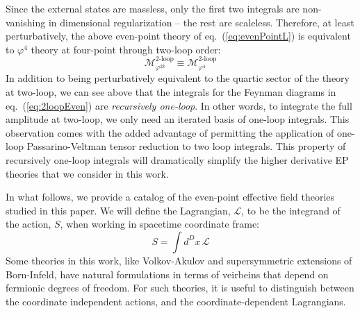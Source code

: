\documentclass[12pt,letter]{article}
\def\eqn#1{eq.~(\ref{#1})}
\def\be{\begin{equation}}
\def\ee{\end{equation}}
\begin{document}
Since the external states are massless, only the first two integrals are non-vanishing in dimensional regularization -- the rest are scaleless. Therefore, at least perturbatively, the above even-point theory of \eqn{eq:evenPointL} is equivalent to $\varphi^4$ theory at four-point through two-loop order: 
\begin{equation}
\mathcal{M}_{\varphi^{2k}}^{\text{2-loop}} \equiv \mathcal{M}_{\varphi^{4}}^{\text{2-loop}} 
\end{equation}
In addition to being perturbatively equivalent to the quartic sector of the theory at two-loop, we can see above that the integrals for the Feynman diagrams in \eqn{eq:2loopEven} are \textit{recursively one-loop}. In other words, to integrate the full amplitude at two-loop, we only need an iterated basis of one-loop integrals. This observation comes with the added advantage of permitting the application of one-loop Passarino-Veltman tensor reduction \cite{Passarino:1978jh} to two loop integrals. This property of recursively one-loop integrals will dramatically simplify the higher derivative EP theories that we consider in this work. 

In what follows, we provide a catalog of the even-point effective field theories studied in this paper. We will define the Lagrangian, $\mathcal{L}$, to be the integrand of the action, $S$, when working in spacetime coordinate frame:
\be
S= \int d^D x \,\mathcal{L}
\ee
Some theories in this work, like Volkov-Akulov and supersymmetric extensions of Born-Infeld, have natural formulations in terms of veirbeins that depend on fermionic degrees of freedom. For such theories, it is useful to distinguish between the coordinate independent actions, and the coordinate-dependent Lagrangians. 
\end{document}

